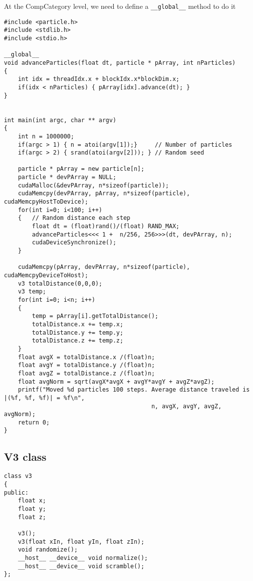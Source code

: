 At the CompCategory level, we need to define a \verb!__global__! method to do it
\begin{verbatim}
#include <particle.h>
#include <stdlib.h>
#include <stdio.h>

__global__ 
void advanceParticles(float dt, particle * pArray, int nParticles)
{
    int idx = threadIdx.x + blockIdx.x*blockDim.x;
    if(idx < nParticles) { pArray[idx].advance(dt); } 
} 


int main(int argc, char ** argv) 
{     
    int n = 1000000;     
    if(argc > 1) { n = atoi(argv[1]);}     // Number of particles
    if(argc > 2) { srand(atoi(argv[2])); } // Random seed

    particle * pArray = new particle[n];
    particle * devPArray = NULL;
    cudaMalloc(&devPArray, n*sizeof(particle));
    cudaMemcpy(devPArray, pArray, n*sizeof(particle), cudaMemcpyHostToDevice);
    for(int i=0; i<100; i++)
    {   // Random distance each step
        float dt = (float)rand()/(float) RAND_MAX;
        advanceParticles<<< 1 +  n/256, 256>>>(dt, devPArray, n);
        cudaDeviceSynchronize();
    }

    cudaMemcpy(pArray, devPArray, n*sizeof(particle), cudaMemcpyDeviceToHost);
    v3 totalDistance(0,0,0);
    v3 temp;
    for(int i=0; i<n; i++)
    {
        temp = pArray[i].getTotalDistance();
        totalDistance.x += temp.x;
        totalDistance.y += temp.y;
        totalDistance.z += temp.z;
    }
    float avgX = totalDistance.x /(float)n;
    float avgY = totalDistance.y /(float)n;
    float avgZ = totalDistance.z /(float)n;
    float avgNorm = sqrt(avgX*avgX + avgY*avgY + avgZ*avgZ);
    printf("Moved %d particles 100 steps. Average distance traveled is |(%f, %f, %f)| = %f\n", 
                                          n, avgX, avgY, avgZ, avgNorm);
    return 0;
}
\end{verbatim}

\subsection{V3 class }


\begin{verbatim}
class v3
{
public:
    float x;
    float y;
    float z;

    v3();
    v3(float xIn, float yIn, float zIn);
    void randomize();
    __host__ __device__ void normalize();
    __host__ __device__ void scramble();
};
\end{verbatim}



